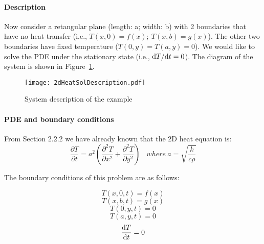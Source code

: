 

\paragraph{Description}
Now consider a retangular plane (length: a; width: b) with 2 boundaries that have no heat transfer (i.e., $T(x, 0)=f(x);\ T(x, b)=g(x)$). The other two boundaries have fixed temperature ($T(0, y)=T(a, y)=0$). We would like to solve the PDE under the stationary state (i.e., $\mathrm d T/\mathrm d t=0$). The diagram of the system is shown in Figure~\ref{heatSolSystem.fig}.
\begin{figure}[htb]
	\centering
	\texttt{[image: 2dHeatSolDescription.pdf]}       
	\caption{System description of the example}\label{heatSolSystem.fig}
\end{figure}

\paragraph{PDE and boundary conditions}
From Section 2.2.2 we have already known that the 2D heat equation is:
\begin{equation}
\frac{\partial T}{\partial t}=a^2\left(\frac{\partial ^2 T}{\partial x^2}+\frac{\partial ^2 T}{\partial y^2}\right)\ \ \ \ where\ a=\sqrt{\frac{k}{c\rho}}
\end{equation}


The boundary conditions of this problem are as follows:

\begin{equation}\label{2DHeatBound1.eq}
T(x,0,t)=f(x)
\end{equation}
\begin{equation}\label{2DHeatBound2.eq}
T(x,b,t)=g(x)
\end{equation}
\begin{equation}\label{2DHeatBound3.eq}
T(0, y, t)=0
\end{equation}
\begin{equation}\label{2DHeatBound4.eq}
T(a, y, t)=0
\end{equation}
\begin{equation}
\frac{\mathrm d T}{\mathrm d t}=0
\end{equation}

